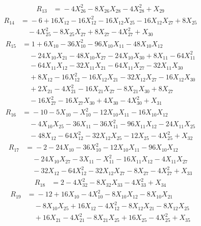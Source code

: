 \[\begin{aligned}
R_{13} &={}-4X_{26}^{2} - 8X_{26}X_{28} - 4X_{28}^{2} + X_{29}
\end{aligned}\]
\[\begin{aligned}
R_{14} &={}-6 + 16X_{12} - 16X_{12}^{2} - 16X_{12}X_{25} - 16X_{12}X_{27} + 8X_{25}\\
&\quad{} - 4X_{25}^{2} - 8X_{25}X_{27} + 8X_{27} - 4X_{27}^{2} + X_{30}
\end{aligned}\]
\[\begin{aligned}
R_{15} &={}1 + 6X_{10} - 36X_{10}^{2} - 96X_{10}X_{11} - 48X_{10}X_{12}\\
&\quad{} - 24X_{10}X_{21} - 48X_{10}X_{27} - 24X_{10}X_{30} + 8X_{11} - 64X_{11}^{2}\\
&\quad{} - 64X_{11}X_{12} - 32X_{11}X_{21} - 64X_{11}X_{27} - 32X_{11}X_{30}\\
&\quad{} + 8X_{12} - 16X_{12}^{2} - 16X_{12}X_{21} - 32X_{12}X_{27} - 16X_{12}X_{30}\\
&\quad{} + 2X_{21} - 4X_{21}^{2} - 16X_{21}X_{27} - 8X_{21}X_{30} + 8X_{27}\\
&\quad{} - 16X_{27}^{2} - 16X_{27}X_{30} + 4X_{30} - 4X_{30}^{2} + X_{31}
\end{aligned}\]
\[\begin{aligned}
R_{16} &={}-10 - 5X_{10} - X_{10}^{2} - 12X_{10}X_{11} - 16X_{10}X_{12}\\
&\quad{} - 4X_{10}X_{25} - 36X_{11} - 36X_{11}^{2} - 96X_{11}X_{12} - 24X_{11}X_{25}\\
&\quad{} - 48X_{12} - 64X_{12}^{2} - 32X_{12}X_{25} - 12X_{25} - 4X_{25}^{2} + X_{32}
\end{aligned}\]
\[\begin{aligned}
R_{17} &={}-2 - 24X_{10} - 36X_{10}^{2} - 12X_{10}X_{11} - 96X_{10}X_{12}\\
&\quad{} - 24X_{10}X_{27} - 3X_{11} - X_{11}^{2} - 16X_{11}X_{12} - 4X_{11}X_{27}\\
&\quad{} - 32X_{12} - 64X_{12}^{2} - 32X_{12}X_{27} - 8X_{27} - 4X_{27}^{2} + X_{33}
\end{aligned}\]
\[\begin{aligned}
R_{18} &={}2 - 4X_{32}^{2} - 8X_{32}X_{33} - 4X_{33}^{2} + X_{34}
\end{aligned}\]
\[\begin{aligned}
R_{19} &={}-12 + 16X_{10} - 4X_{10}^{2} - 8X_{10}X_{12} - 8X_{10}X_{21}\\
&\quad{} - 8X_{10}X_{25} + 16X_{12} - 4X_{12}^{2} - 8X_{12}X_{21} - 8X_{12}X_{25}\\
&\quad{} + 16X_{21} - 4X_{21}^{2} - 8X_{21}X_{25} + 16X_{25} - 4X_{25}^{2} + X_{35}
\end{aligned}\]
